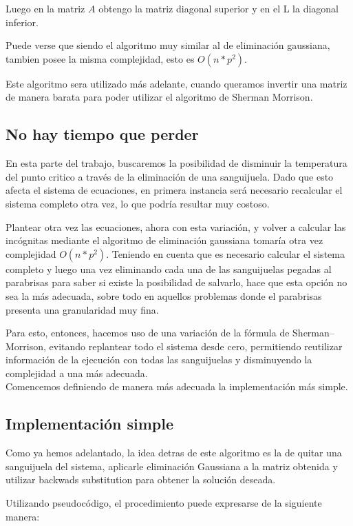 Luego en la matriz $A$ obtengo la matriz diagonal superior y en el L la diagonal inferior.

Puede verse que siendo el algoritmo muy similar al de eliminación gaussiana, tambien posee la misma complejidad, esto es $O(n*p^2)$.

Este algoritmo sera utilizado más adelante, cuando queramos invertir una matriz de manera barata para poder utilizar el algoritmo de Sherman Morrison.

\subsection{No hay tiempo que perder}

En esta parte del trabajo, buscaremos la posibilidad de disminuir la temperatura del punto critico a través de la eliminación de una sanguijuela. Dado que esto afecta el sistema de ecuaciones, en primera instancia será necesario recalcular el sistema completo otra vez, lo que podría resultar muy costoso.

Plantear otra vez las ecuaciones, ahora con esta variación, y volver a calcular las incógnitas mediante el algoritmo de eliminación gaussiana tomaría otra vez complejidad $O(n*p^2)$. Teniendo en cuenta que es necesario calcular el sistema completo y luego una vez eliminando cada una de las sanguijuelas pegadas al parabrisas para saber si existe la posibilidad de salvarlo, hace que esta opción no sea la más adecuada, sobre todo en aquellos problemas donde el parabrisas presenta una granularidad muy fina. 

Para esto, entonces, hacemos uso de una variación de la fórmula de Sherman–Morrison, evitando replantear todo el sistema desde cero, permitiendo reutilizar información de la ejecución con todas las sanguijuelas y disminuyendo la complejidad a una más adecuada.
\\
Comencemos definiendo de manera más adecuada la implementación más simple.

\subsection{Implementación simple}

Como ya hemos adelantado, la idea detras de este algoritmo es la de quitar una sanguijuela del sistema, aplicarle eliminación Gaussiana a la matriz obtenida y utilizar backwads substitution para obtener la solución deseada.

Utilizando pseudocódigo, el procedimiento puede expresarse de la siguiente manera:

